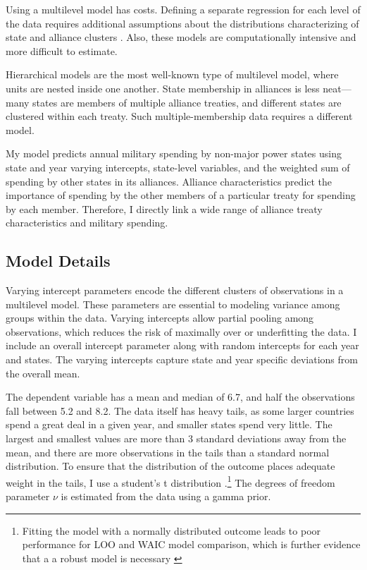 \documentclass[12pt]{article}
\begin{document}
Using a multilevel model has costs. Defining a separate regression for each level of the data requires additional assumptions about the distributions characterizing of state and alliance clusters \citep{McElreath2016}. Also, these models are computationally intensive and more difficult to estimate.

Hierarchical models are the most well-known type of multilevel model, where units are nested inside one another. State membership in alliances is less neat--- many states are members of multiple alliance treaties, and different states are clustered within each treaty. Such multiple-membership data requires a different model. 

My model predicts annual military spending by non-major power states using state and year varying intercepts, state-level variables, and the weighted sum of spending by other states in its alliances. Alliance characteristics predict the importance of spending by the other members of a particular treaty for spending by each member. Therefore, I directly link a wide range of alliance treaty characteristics and military spending. 

\subsection*{Model Details}

Varying intercept parameters encode the different clusters of observations in a multilevel model. These parameters are essential to modeling variance among groups within the data. Varying intercepts allow partial pooling among observations, which reduces the risk of maximally over or underfitting the data. I include an overall intercept parameter along with random intercepts for each year and states. The varying intercepts capture state and year specific deviations from the overall mean.

The dependent variable has a mean and median of 6.7, and half the observations fall between 5.2 and 8.2. The data itself has heavy tails, as some larger countries spend a great deal in a given year, and smaller states spend very little. The largest and smallest values are more than 3 standard deviations away from the mean, and there are more observations in the tails than a standard normal distribution. To ensure that the distribution of the outcome places adequate weight in the tails, I use a student's t distribution \citep{JuarezSteele2010}.\footnote{Fitting the model with a normally distributed outcome leads to poor performance for LOO and WAIC model comparison, which is further evidence that a a robust model is necessary \citep{Vehtarietal2017}}  The degrees of freedom parameter $\nu$ is estimated from the data using a gamma prior.
\end{document}
